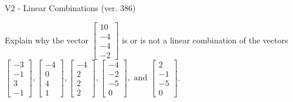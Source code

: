 \begin{exercise}
  \begin{exerciseTitle}V2 - Linear Combinations (ver. 386)\end{exerciseTitle}
  \begin{exerciseStatement}
    Explain why the vector \(\left[\begin{array}{c}
10 \\
-4 \\
-4 \\
-2
\end{array}\right]\)  is or is not a linear 
	combination of the vectors \(\left[\begin{array}{c}
-3 \\
-1 \\
3 \\
-1
\end{array}\right] , \left[\begin{array}{c}
-4 \\
0 \\
4 \\
1
\end{array}\right] , \left[\begin{array}{c}
-4 \\
2 \\
2 \\
2
\end{array}\right] , \left[\begin{array}{c}
-4 \\
-2 \\
-5 \\
0
\end{array}\right] , \text{ and } \left[\begin{array}{c}
2 \\
-1 \\
-5 \\
0
\end{array}\right]\).
	



\end{exerciseStatement}
\end{exercise}
